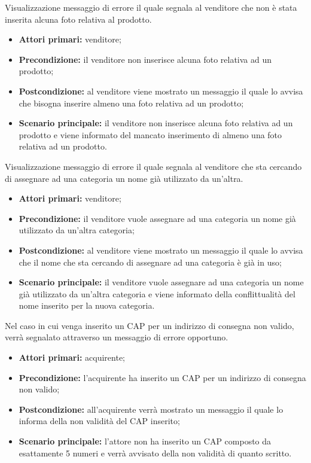 Visualizzazione messaggio di errore il quale segnala al venditore che non è stata inserita alcuna foto relativa al prodotto.
\begin{itemize}
    \item \textbf{Attori primari:} venditore;
    \item \textbf{Precondizione:} il venditore non inserisce alcuna foto relativa ad un prodotto;
    \item \textbf{Postcondizione:} al venditore viene mostrato un messaggio il quale lo avvisa che bisogna inserire almeno una foto relativa ad un prodotto;
    \item \textbf{Scenario principale:} il venditore non inserisce alcuna foto relativa ad un prodotto e viene informato del mancato inserimento di almeno una foto relativa ad un prodotto.
\end{itemize}

\label{estensione:categoria-esistente}

Visualizzazione messaggio di errore il quale segnala al venditore che sta cercando di assegnare ad una categoria un nome già utilizzato da un'altra.
\begin{itemize}
    \item \textbf{Attori primari:} venditore;
    \item \textbf{Precondizione:} il venditore vuole assegnare ad una categoria un nome già utilizzato da un'altra categoria;
    \item \textbf{Postcondizione:} al venditore viene mostrato un messaggio il quale lo avvisa che il nome che sta cercando di assegnare ad una categoria è già in uso;
    \item \textbf{Scenario principale:} il venditore vuole assegnare ad una categoria un nome già utilizzato da un'altra categoria e viene informato della conflittualità del nome inserito per la nuova categoria.
\end{itemize}

\label{estensione:cap-non-valido}

Nel caso in cui venga inserito un CAP per un indirizzo di consegna non valido, verrà segnalato attraverso un messaggio di errore opportuno.
\begin{itemize}
	\item \textbf{Attori primari:} acquirente;
	\item \textbf{Precondizione:} l'acquirente ha inserito un CAP per un indirizzo di consegna non valido;
	\item \textbf{Postcondizione:} all'acquirente verrà mostrato un messaggio il quale lo informa della non validità del CAP inserito;
	\item \textbf{Scenario principale:} l'attore non ha inserito un CAP composto da esattamente 5 numeri e verrà avvisato della non validità di quanto scritto.
\end{itemize}

